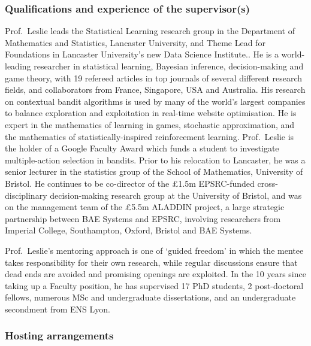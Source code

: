 \documentclass[a4paper,11pt]{article}
\renewcommand{\cite}{\autocite} %
\begin{document}
\subsubsection*{Qualifications and experience of the supervisor(s)}

Prof.\ Leslie leads the Statistical Learning research group in the Department of Mathematics and Statistics, Lancaster University, and Theme Lead for Foundations in Lancaster University's new Data Science Institute..  He is a world-leading researcher in statistical learning, Bayesian inference, decision-making and game theory, with 19 refereed articles in top journals of several different research fields, and collaborators from France, Singapore, USA and Australia.  His research on contextual bandit algorithms \cite{MayEtAl2012} is used by many of the world's largest companies to balance exploration and exploitation in real-time website optimisation.  He is expert in the mathematics of learning in games, \cite{LeslieCollins03,LeslieCollins05,LeslieCollins06,ChapmanEtAl2013,PerkinsLeslie2014} stochastic approximation, \cite{LeslieCollins03,PerkinsLeslie2012,PerkinsLeslie2014} and the mathematics of statistically-inspired reinforcement learning. \cite{LeslieCollins05,LarsenEtAl2010}  Prof.\ Leslie is the holder of a Google Faculty Award which funds a student to investigate multiple-action selection in bandits.  Prior to his relocation to Lancaster, he was a senior lecturer in the statistics group of the School of Mathematics, University of Bristol.  He continues to be co-director of the \pounds1.5m EPSRC-funded cross-disciplinary decision-making research group at the University of Bristol, and was on the management team of the \pounds5.5m ALADDIN project, a large strategic partnership between BAE Systems and EPSRC, involving researchers from Imperial College, Southampton, Oxford, Bristol and BAE Systems.

Prof.\ Leslie's mentoring approach is one of `guided freedom' in which the mentee takes responsibility for their own research, while regular discussions ensure that dead ends are avoided and promising openings are exploited.  In the 10 years since taking up a Faculty position, he has supervised 17 PhD students, 2 post-doctoral fellows, numerous MSc and undergraduate dissertations, and an undergraduate secondment from ENS Lyon.

\subsubsection*{Hosting arrangements}
\end{document}
